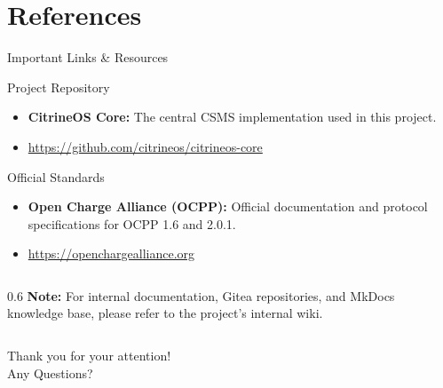 \documentclass[11pt]{beamer}
\begin{document}
\section{References}
\begin{frame}{Important Links \& Resources}
    \begin{block}{Project Repository}
        \begin{itemize}
            \item \textbf{CitrineOS Core:} The central CSMS implementation used in this project.
            \item \url{https://github.com/citrineos/citrineos-core}
        \end{itemize}
    \end{block}

    \begin{block}{Official Standards}
        \begin{itemize}
            \item \textbf{Open Charge Alliance (OCPP):} Official documentation and protocol specifications for OCPP 1.6 and 2.0.1.
            \item \url{https://openchargealliance.org}
        \end{itemize}
    \end{block}

    \vfill
    \begin{columns}
        \begin{column}{0.6\textwidth}
            \footnotesize
            \textbf{Note:} For internal documentation, Gitea repositories, and MkDocs knowledge base, please refer to the project's internal wiki.
        \end{column}
    \end{columns}
\end{frame}

\begin{frame}
    \centering
    \Huge Thank you for your attention!\\
    \vspace{1cm}
    \Large Any Questions?
\end{frame}
\end{document}
